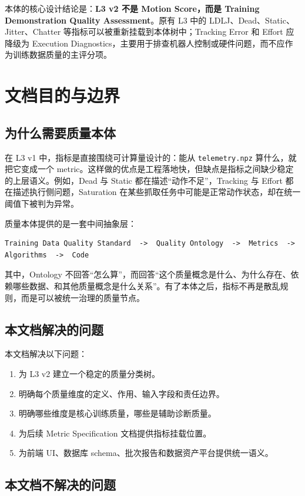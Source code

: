 \documentclass[UTF8,zihao=-4]{ctexart}
\newcommand{\Code}[1]{\texttt{#1}}
\newcommand{\Term}[1]{\textbf{#1}}
\begin{document}
本体的核心设计结论是：\Term{L3 v2 不是 Motion Score，而是 Training Demonstration Quality Assessment}。原有 L3 中的 LDLJ、Dead、Static、Jitter、Chatter 等指标可以被重新挂载到本体树中；Tracking Error 和 Effort 应降级为 Execution Diagnostics，主要用于排查机器人控制或硬件问题，而不应作为训练数据质量的主评分项。

\section{文档目的与边界}

\subsection{为什么需要质量本体}

在 L3 v1 中，指标是直接围绕可计算量设计的：能从 \Code{telemetry.npz} 算什么，就把它变成一个 metric。这样做的优点是工程落地快，但缺点是指标之间缺少稳定的上层语义。例如，Dead 与 Static 都在描述“动作不足”，Tracking 与 Effort 都在描述执行侧问题，Saturation 在某些抓取任务中可能是正常动作状态，却在统一阈值下被判为异常。

质量本体提供的是一套中间抽象层：
\begin{verbatim}
Training Data Quality Standard  ->  Quality Ontology  ->  Metrics  ->  Algorithms  ->  Code
\end{verbatim}

其中，Ontology 不回答“怎么算”，而回答“这个质量概念是什么、为什么存在、依赖哪些数据、和其他质量概念是什么关系”。有了本体之后，指标不再是散乱规则，而是可以被统一治理的质量节点。

\subsection{本文档解决的问题}

本文档解决以下问题：
\begin{enumerate}
  \item 为 L3 v2 建立一个稳定的质量分类树。
  \item 明确每个质量维度的定义、作用、输入字段和责任边界。
  \item 明确哪些维度是核心训练质量，哪些是辅助诊断质量。
  \item 为后续 Metric Specification 文档提供指标挂载位置。
  \item 为前端 UI、数据库 schema、批次报告和数据资产平台提供统一语义。
\end{enumerate}

\subsection{本文档不解决的问题}
\end{document}
